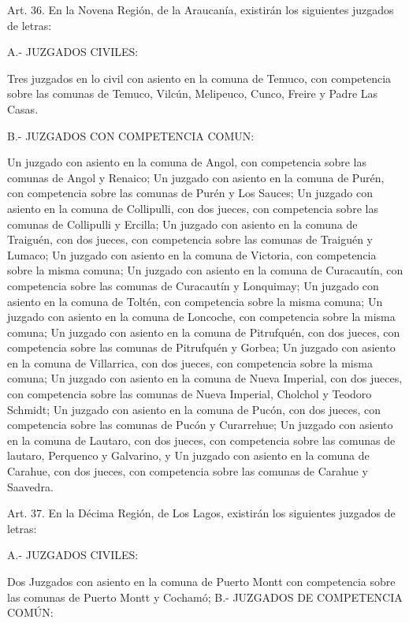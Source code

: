     Art. 36. En la Novena Región, de la Araucanía, existirán los siguientes juzgados de letras:

    A.- JUZGADOS CIVILES:

    Tres juzgados en lo civil con asiento en la comuna de Temuco, con competencia sobre las comunas de Temuco, Vilcún, Melipeuco, Cunco, Freire y Padre Las Casas.

    B.- JUZGADOS CON COMPETENCIA COMUN:

    Un juzgado con asiento en la comuna de Angol, con competencia sobre las comunas de Angol y Renaico;
    Un juzgado con asiento en la comuna de Purén, con competencia sobre las comunas de Purén y Los Sauces;
    Un juzgado con asiento en la comuna de Collipulli, con dos jueces, con competencia sobre las comunas de Collipulli y Ercilla;
    Un juzgado con asiento en la comuna de Traiguén, con dos jueces, con competencia sobre las comunas de Traiguén y Lumaco;
    Un juzgado con asiento en la comuna de Victoria, con competencia sobre la misma comuna;
    Un juzgado con asiento en la comuna de Curacautín, con competencia sobre las comunas de Curacautín y Lonquimay;
    Un juzgado con asiento en la comuna de Toltén, con competencia sobre la misma comuna;
    Un juzgado con asiento en la comuna de Loncoche, con competencia sobre la misma comuna;
    Un juzgado con asiento en la comuna de Pitrufquén, con dos jueces, con competencia sobre las comunas de Pitrufquén y Gorbea;
    Un juzgado con asiento en la comuna de Villarrica, con dos jueces, con competencia sobre la misma comuna;
    Un juzgado con asiento en la comuna de Nueva Imperial, con dos jueces, con competencia sobre las comunas de Nueva Imperial, Cholchol y Teodoro Schmidt;
    Un juzgado con asiento en la comuna de Pucón, con dos jueces, con competencia sobre las comunas de Pucón y Curarrehue;
    Un juzgado con asiento en la comuna de Lautaro, con dos jueces, con competencia sobre las comunas de lautaro, Perquenco y Galvarino, y
    Un juzgado con asiento en la comuna de Carahue, con dos jueces, con competencia sobre las comunas de Carahue y Saavedra.


    Art. 37. En la Décima Región, de Los Lagos, existirán los siguientes juzgados de letras:

    A.- JUZGADOS CIVILES:

    Dos Juzgados con asiento en la comuna de Puerto Montt con competencia sobre las comunas de Puerto Montt y Cochamó;
    B.- JUZGADOS DE COMPETENCIA COMÚN:


